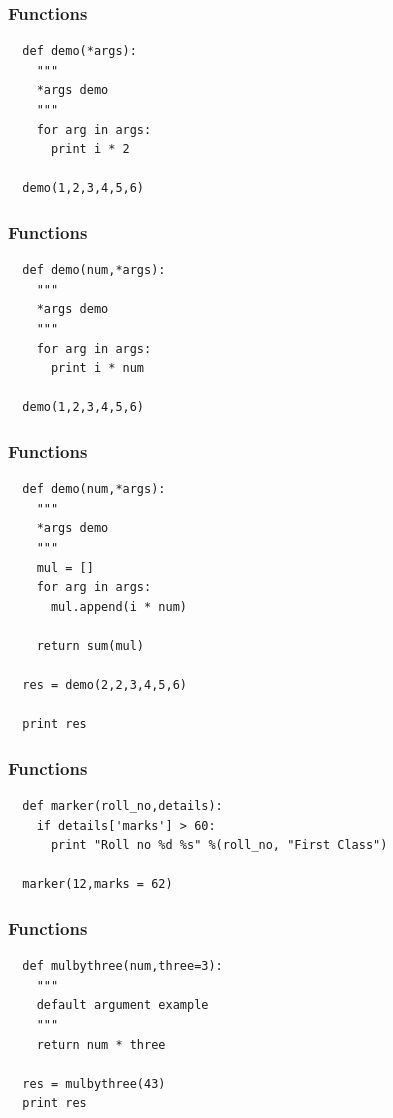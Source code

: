 \documentclass{beamer}
\begin{document}
\begin{frame}[fragile]
 \frametitle{Functions}
 \begin{verbatim}
  def demo(*args):
    """
    *args demo
    """ 
    for arg in args:
      print i * 2
  
  demo(1,2,3,4,5,6)
 \end{verbatim}

\end{frame}

\begin{frame}[fragile]
 \frametitle{Functions}
 \begin{verbatim}
  def demo(num,*args):
    """
    *args demo
    """ 
    for arg in args:
      print i * num
  
  demo(1,2,3,4,5,6)
 \end{verbatim}

\end{frame}

\begin{frame}[fragile]
 \frametitle{Functions}
 \begin{verbatim}
  def demo(num,*args):
    """
    *args demo
    """ 
    mul = []
    for arg in args:
      mul.append(i * num)
    
    return sum(mul)
  
  res = demo(2,2,3,4,5,6)
  
  print res
 \end{verbatim}

\end{frame}

\begin{frame}[fragile]
 \frametitle{Functions}
 \begin{verbatim}
  def marker(roll_no,details):
    if details['marks'] > 60:
      print "Roll no %d %s" %(roll_no, "First Class")
  
  marker(12,marks = 62)
 \end{verbatim}

\end{frame}

\begin{frame}[fragile]
 \frametitle{Functions}
 \begin{verbatim}
  def mulbythree(num,three=3):
    """
    default argument example
    """
    return num * three
  
  res = mulbythree(43)
  print res
 \end{verbatim}

\end{frame}
\end{document}
